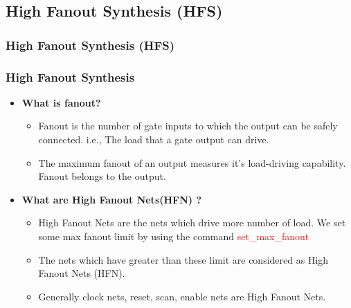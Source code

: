 \documentclass[compress]{beamer}
\begin{document}
\subsection[HFNS]{High Fanout Synthesis (HFS)}
\begin{frame}
	\frametitle{High Fanout Synthesis (HFS)}
	\begin{center}
	\end{center}
\end{frame}
\begin{frame}
	\frametitle{High Fanout Synthesis}
	\begin{itemize}
		\item \textbf{What is fanout?}
			\begin{itemize}
				\item Fanout is the number of gate inputs to which the output can be safely connected. i.e., The load that a gate output can drive. 
				\item The maximum fanout of an output measures it’s load-driving capability. Fanout belongs to the output.
			\end{itemize}
		\item \textbf{What are High Fanout Nets(HFN) ?}
		\begin{itemize}
			\item High Fanout Nets are the nets which drive more number of load. We set some max fanout limit by using the command \textcolor{red}{set\_max\_fanout}
			\item The nets which have greater than these limit are considered as High Fanout Nets (HFN). 
			\item Generally clock nets, reset, scan, enable nets are High Fanout Nets.
		\end{itemize}
	\end{itemize}
\end{frame}
\end{document}
